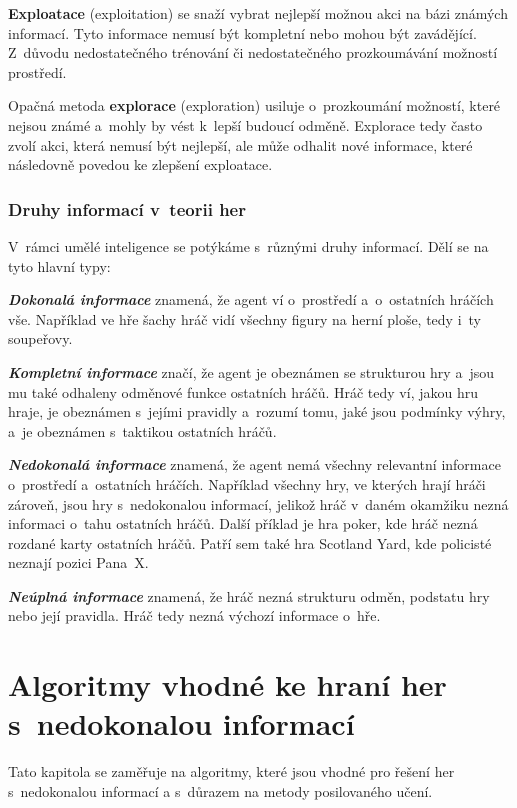 \textbf{Exploatace} (exploitation) se snaží vybrat nejlepší možnou akci na bázi známých informací.
Tyto informace nemusí být kompletní nebo mohou být zavádějící.
Z~důvodu nedostatečného trénování či nedostatečného prozkoumávání možností prostředí.

Opačná metoda \textbf{explorace} (exploration) usiluje o~prozkoumání možností, které nejsou známé a~mohly by vést k~lepší budoucí odměně.
Explorace tedy často zvolí akci, která nemusí být nejlepší, ale může odhalit nové informace, které následovně povedou ke zlepšení exploatace.

\subsection{Druhy informací v~teorii her}\label{subsec:druhy-informaci-v-teorii-her}
V~rámci umělé inteligence se potýkáme s~různými druhy informací.
Dělí se na tyto hlavní typy:

\textbf{\emph{Dokonalá informace}} znamená, že agent ví o~prostředí a~o~ostatních hráčích vše.
Například ve hře šachy hráč vidí všechny figury na herní ploše, tedy i~ty soupeřovy.

\textbf{\emph{Kompletní informace}} značí, že agent je obeznámen se strukturou hry a~jsou mu také odhaleny odměnové funkce ostatních hráčů.
Hráč tedy ví, jakou hru hraje, je obeznámen s~jejími pravidly a~rozumí tomu, jaké jsou podmínky výhry, a~je obeznámen s~taktikou ostatních hráčů.

\textbf{\emph{Nedokonalá informace}} znamená, že agent nemá všechny relevantní informace o~prostředí a~ostatních hráčích.
Například všechny hry, ve kterých hrají hráči zároveň, jsou hry s~nedokonalou informací, jelikož hráč v~daném okamžiku nezná informaci o~tahu ostatních hráčů.
Další příklad je hra poker, kde hráč nezná rozdané karty ostatních hráčů.
Patří sem také hra Scotland Yard, kde policisté neznají pozici Pana~X\@.

\textbf{\emph{Neúplná informace}} znamená, že hráč nezná strukturu odměn, podstatu hry nebo její pravidla.
Hráč tedy nezná výchozí informace o~hře.

\chapter{Algoritmy vhodné ke hraní her s~nedokonalou informací}\label{sec:vhodne-algoritmy-k-reseni-her-s-nedokonalou-informaci}

Tato kapitola se zaměřuje na algoritmy, které jsou vhodné pro řešení her s~nedokonalou informací a s~důrazem na metody posilovaného učení.

